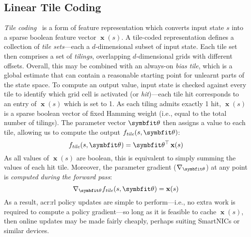 \subsection{Linear Tile Coding}\label{sec:tile-code}
\emph{Tile coding}~\parencite[pp.~\numrange{217}{221}]{RL2E} is a form of feature representation which converts input state $s$ into a sparse boolean feature vector $\operatorname{\mathbf{x}}(s)$.
A tile-coded representation defines a collection of \emph{tile sets}---each a $d$-dimensional subset of input state.
Each tile set then comprises a set of \emph{tilings}, overlapping $d$-dimensional grids with different offsets.
Overall, this may be combined with an always-on \emph{bias tile}, which is a global estimate that can contain a reasonable starting point for unlearnt parts of the state space.
To compute an output value, input state is checked against every tile to identify which grid cell is activated (or \emph{hit})---each tile hit corresponds to an entry of $\operatorname{\mathbf{x}}(s)$ which is set to 1.
As each tiling admits exactly 1 hit, $\operatorname{\mathbf{x}}(s)$ is a sparse boolean vector of fixed Hamming weight (i.e., equal to the total number of tilings).
The parameter vector $\wvec{}$ then assigns a value to each tile, allowing us to compute the output $f_\mathit{tile}(s, \wvec{})$:
\begin{equation}
	f_\mathit{tile}(s, \wvec{}) = \wvec{}^{\top} \operatorname{\mathbf{x}}(s)
	\label{eqn:lin-approx}
\end{equation}
As all values of $\operatorname{\mathbf{x}}(s)$ are boolean, this is equivalent to simply summing the values of each hit tile.
Moreover, the parameter gradient ($\nabla_{\wvec{}}$) at any point is \emph{computed during the forward pass}:
\begin{equation}
	\nabla_{\wvec{}}{f_\mathit{tile}(s, \wvec{})} = \operatorname{\mathbf{x}}(s)
\end{equation}
As a result, \gls{acr:rl} policy updates are simple to perform---i.e., no extra work is required to compute a policy gradient---so long as it is feasible to cache $\operatorname{\mathbf{x}}(s)$, then online updates may be made fairly cheaply, perhaps suiting SmartNICs or similar devices.

